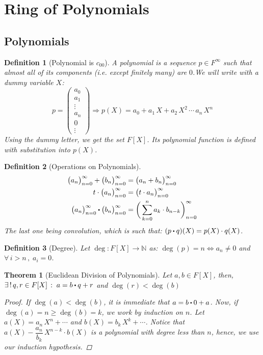 \documentclass[12pt]{article}
\let\RA\Rightarrow
\let\LR\Leftrightarrow
\newcommand{\Forall}[1]{\forall\,{#1}\,,\;}
\newcommand{\Exist}[1]{\exists\,{#1}\,:\;}
\newtheorem{theorem}{Theorem}[subsection]
\newtheorem{definition}{Definition}[subsection]
\begin{document}
\pagebreak

\section{Ring of Polynomials}

\subsection{Polynomials}

\begin{definition}[Polynomial is $c_{00}$]
  A polynomial is a sequence $p\in F^\infty$ such that almost all of its components (i.e. except finitely many) are $0$.We will write with a dummy variable $X$:
  $$
  p=\begin{pmatrix}
    a_0\\a_1\\\vdots\\a_n\\0\\\vdots
  \end{pmatrix}\RA
  p(X)=a_0+a_1\,X+a_2\,X^2\,\cdots\,a_n\,X^n
  $$
  Using the dummy letter, we get the set $F[X]$. Its polynomial function is defined with substitution into $p(X)$.
\end{definition}

\begin{definition}[Operations on Polynomials]
  \begin{align*}
    \big(a_n\big)_{n=0}^\infty+\big(b_n\big)_{n=0}^\infty&=\big(a_n+b_n\big)_{n=0}^\infty\\
    t\cdot \big(a_n\big)_{n=0}^\infty&=\big(t\cdot a_n\big)_{n=0}^\infty\\
    \big(a_n\big)_{n=0}^\infty\bigcdot\big(b_n\big)_{n=0}^\infty&=\bigg(\sum_{k=0}^n a_k\cdot b_{n-k}\bigg)_{n=0}^\infty
  \end{align*}
  The last one being convolution, which is such that: $(p\bigcdot q)(X)=p(X)\cdot q(X)$.
\end{definition}

\begin{definition}[Degree]
  Let $\deg:F[X]\to\mathbb{N}$ as: $\deg(p)=n\LR a_n\neq 0$ and $\Forall{i>n}a_i=0$.
\end{definition}

\begin{theorem}[Euclidean Division of Polynomials]
  Let $a,b\in F[X]$, then, $\Exist{!\,q,r\in F[X]} a=b\bigcdot q+r$ and $\deg(r)<\deg(b)$
  \begin{proof}
    If $\deg(a)<\deg(b)$, it is immediate that $a=b\bigcdot 0+a$. Now, if $\deg(a)=n\geq \deg(b)=k$, we work by induction on $n$. Let $a(X)=a_n\,X^n+\cdots$ and $b(X)=b_k\,X^k+\cdots$. Notice that $a(X)-\dfrac{a_n}{b_k}\,X^{n-k}\cdot b(X)$ is a polynomial with degree less than $n$, hence, we use our induction hypothesis.
  \end{proof}
\end{theorem}
\end{document}

